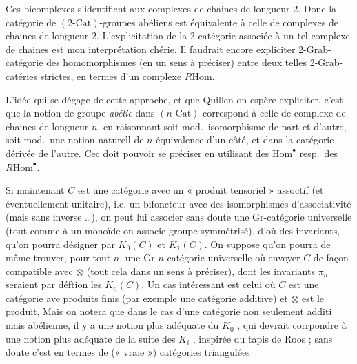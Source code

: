 \documentclass[11pt,a4paper]{article}
\begin{document}


Ces bicomplexes s'identifient aux complexes de chaines de longueur 2. Donc la
catégorie de $(2\text{-Cat})$-groupes abéliens est équivalente à celle de
complexes de chaines de longueur 2. L'explicitation de la 2-catégorie associée
à un tel complexe de chaines est mon interprétation chérie. Il faudrait encore
expliciter  2-Grab-catégorie des homomorphismes (en un sens à
préciser) entre deux telles 2-Grab-catéries strictes, en termes d'un
complexe $R\mathrm{Hom}$.

L'idée qui se dégage de cette approche, et que Quillen on espère 
expliciter, c'est que la notion de groupe \emph{abélie} dans
$(n\text{-Cat})$ correspond à celle de complexe de chaines de longueur $n$, en
raisonnant soit mod.\ isomorphisme de part et d'autre, soit mod.\ une notion
naturell de $n$-équivalence d'un côté, et dans la catégorie dérivée de
l'autre. Cec doit pouvoir se préciser en utilisant des
$\mathrm{Hom}^{\bullet}$ resp.\ des $R\mathrm{Hom}^{\bullet}$.

Si maintenant $C$ est une catégorie avec un « produit tensoriel »
assoctif (et éventuellement unitaire), i.e. un bifoncteur avec des
isomorphismes d'associativité (mais sans inverse …), on peut lui associer
sans doute une Gr-catégorie universelle (tout comme à un monoïde on associe
 groupe symmétrisé), d'où des invariants, qu'on pourra désigner par
$K_{0}(C)$ et $K_{1}(C)$. On suppose qu'on pourra de même trouver, pour tout
$n$, une Gr-$n$-catégorie universelle où envoyer $C$ de façon compatible avec
$\otimes$ (tout cela dans un sens à préciser), dont les invariants $\pi_{n}$
seraient par déftion les $K_{n}(C)$. Un cas intéressant est celui où
$C$ est une catégorie ave produits finis (par exemple une catégorie
additive) et $\otimes$ est le produit, \supplied{[}Mais on notera que dans le cas d'une
catégorie non seulement additi mais abélienne, il y a une notion plus
adéquate du $K_{0}$ , qui devrait corrpondre à une notion plus
adéquate de la suite des $K_{i}$ , inspirée du tapis de Roos ; sans doute
c'est en termes de (« vraie ») catégories triangulées
\end{document}
